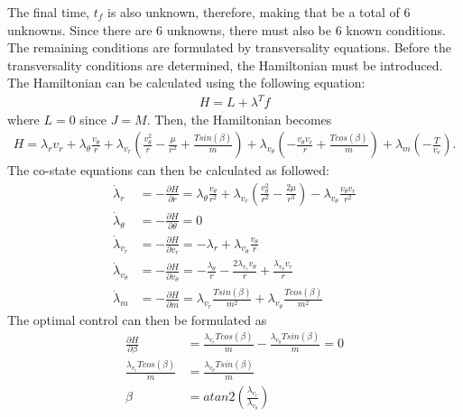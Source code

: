 \documentclass[]{article}
\begin{document}
The final time, \(t_f\) is also unknown, therefore, making that be a total of 6 unknowns. Since there are 6 unknowns, there must also be 6 known conditions. The remaining conditions are formulated by transversality equations. Before the transversality conditions are determined, the Hamiltonian must be introduced. The Hamiltonian can be calculated using the following equation:
\begin{align}
	H = L + \lambda^{T}f
\end{align}
where \(L = 0\) since \(J = M\). Then, the Hamiltonian becomes
\begin{align*}
	H = \lambda_{r}v_r + \lambda_{\theta}\frac{v_\theta}{r} + \lambda_{v_r}(\frac{v^2_{\theta}}{r} - \frac{\mu}{r^2} + \frac{Tsin(\beta)}{m}) + \lambda_{v_\theta}(-\frac{v_{\theta}v_{r}}{r}   + \frac{Tcos(\beta)}{m}) +\lambda_m(-\frac{T}{v_e}).
\end{align*}
The co-state equations can then be calculated as followed:
\begin{align}
	\dot{\lambda}_r      &= -\frac{\partial{H}}{\partial{r}} = \lambda_\theta\frac{v_\theta}{r^2} + \lambda_{v_r}(\frac{v_{\theta}^2}{r^2} - \frac{2\mu}{r^3}) - \lambda_{v_\theta}\frac{v_{\theta}v_r}{r^2}
																																										  \label{lamdotr} \\
	\dot{\lambda}_\theta &= -\frac{\partial{H}}{\partial{\theta}} = 0                                                                                                     \label{lamdottheta} \\
	\dot{\lambda}_{v_r}  &=  -\frac{\partial{H}}{\partial{v_r}} = -\lambda_r + \lambda_{v_\theta}\frac{v_\theta}{r}                                                       \label{lamdotvr}    \\
	\dot{\lambda}_{v_\theta} &=  -\frac{\partial{H}}{\partial{v_\theta}} = -\frac{\lambda_\theta}{r} - \frac{2\lambda_{v_r}v_\theta}{r} + \frac{\lambda_{v_\theta}v_r}{r} \label{lamdotvtheta}\\
    \dot{\lambda}_m          &=  -\frac{\partial{H}}{\partial{m}} = \lambda_{v_r}\frac{Tsin(\beta)}{m^2} + \lambda_{v_\theta}\frac{Tcos(\beta)}{m^2}                      \label{lamdotm}
\end{align}
The optimal control can then be formulated as
\begin{align}
	\frac{\partial H}{\partial \beta} &= \frac{\lambda_{v_r}Tcos(\beta)}{m} - \frac{\lambda_{v_\theta}Tsin(\beta)}{m} = 0 \nonumber\\
	\frac{\lambda_{v_r}Tcos(\beta)}{m} &= \frac{\lambda_{v_\theta}Tsin(\beta)}{m} \nonumber\\
	\beta &= atan2(\frac{\lambda_{v_r}}{\lambda_{v_\theta}}) \label{control}
\end{align}
\end{document}

